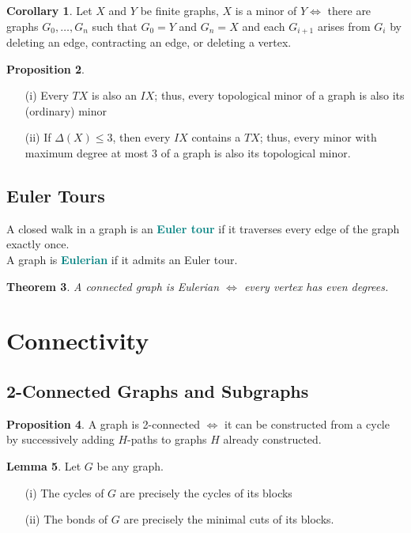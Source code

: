 \documentclass[12pt]{article}
\theoremstyle{plain}
\newtheorem{theorem}{Theorem}[subsection]
\theoremstyle{definition}
\newtheorem{proposition}[theorem]{Proposition}
\newtheorem{corollary}[theorem]{Corollary}
\newtheorem{lemma}[theorem]{Lemma}
\newcommand{\defnterm}[1]{\textbf{\textcolor{teal}{#1}}\index{#1}}
\begin{document}
\begin{corollary}
  Let $X$ and $Y$ be finite graphs, $X$ is a minor of $Y \iff$ there are graphs $G_{0}, \dots, G_{n}$ such that $G_{0} = Y$ and $G_{n} = X$ and each $G_{i+1}$ arises from $G_{i}$ by deleting an edge, contracting an edge, or deleting a vertex.
\end{corollary}

\begin{proposition}
  \leavevmode
  \begin{enumerate}
    \item[(i)] Every $TX$ is also an $IX$;
    thus, every topological minor of a graph is also its (ordinary) minor
    \item[(ii)] If $\Delta(X) \leq 3$, then every $IX$ contains a $TX$;
    thus, every minor with maximum degree at most 3 of a graph is also its topological minor.
  \end{enumerate}
\end{proposition}

\subsection{Euler Tours}
A closed walk in a graph is an \defnterm{Euler tour} if it traverses every edge of the graph exactly once. \\
A graph is \defnterm{Eulerian} if it admits an Euler tour.

\begin{theorem}
  A connected graph is Eulerian $\iff$ every vertex has even degrees.
\end{theorem}


\section{Connectivity}
\subsection{2-Connected Graphs and Subgraphs}
\begin{proposition}
  A graph is 2-connected $\iff$ it can be constructed from a cycle by successively adding $H$-paths to graphs $H$ already constructed.
\end{proposition}

\begin{lemma}
  Let $G$ be any graph.
  \begin{enumerate}
    \item[(i)] The cycles of $G$ are precisely the cycles of its blocks
    \item[(ii)] The bonds of $G$ are precisely the minimal cuts of its blocks.
  \end{enumerate}
\end{lemma}

\clearpage
\printindex
\end{document}
